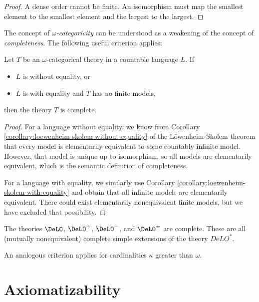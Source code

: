 \begin{proof}
A dense order cannot be finite. An isomorphism must map the smallest element to the smallest element and the largest to the largest.
\end{proof}

The concept of \emph{$\omega$-categoricity} can be understood as a weakening of the concept of \emph{completeness}. The following useful criterion applies:

\begin{theorem}
Let $T$ be an $\omega$-categorical theory in a countable language $L$. If
\begin{itemize}
    \item $L$ is without equality, or
    \item $L$ is with equality and $T$ has no finite models,
\end{itemize}
then the theory $T$ is complete.
\end{theorem}
\begin{proof}
For a language without equality, we know from Corollary \ref{corollary:loewenheim-skolem-without-equality} of the Löwenheim-Skolem theorem that every model is elementarily equivalent to some countably infinite model. However, that model is unique up to isomorphism, so all models are elementarily equivalent, which is the semantic definition of completeness.

For a language with equality, we similarly use Corollary \ref{corollary:loewenheim-skolem-with-equality} and obtain that all infinite models are elementarily equivalent. There could exist elementarily nonequivalent finite models, but we have excluded that possibility.
\end{proof}

\begin{corollary}\label{corollary:complete-simple-extensions-of-delo}
    The theories $\DeLO$, $\DeLO^+$, $\DeLO^-$, and $\DeLO^\pm$ are complete. These are all (mutually nonequivalent) complete simple extensions of the theory $DeLO^*$.
\end{corollary}

\begin{remark}
An analogous criterion applies for cardinalities $\kappa$ greater than $\omega$.
\end{remark}

\section{Axiomatizability}\label{section:axiomatizability}

